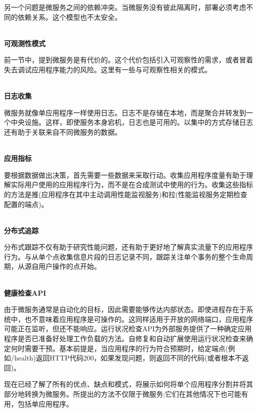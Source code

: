 另一个问题是微服务之间的依赖冲突。当微服务没有彼此隔离时，部署必须考虑不同的依赖关系。这个模型也不太安全。

\hspace*{\fill} \\ %
\noindent
\textbf{可观测性模式}

前一节中，提到微服务是有代价的。这个代价包括引入可观察性的需求，或者冒着失去调试应用程序能力的风险。这里有一些与可观察性相关的模式。

\hspace*{\fill} \\ %
\noindent
\textbf{日志收集}

微服务就像单应用程序一样使用日志。日志不是存储在本地，而是聚合并转发到一个中央设施。这样，即使服务本身宕机，日志也是可用的。以集中的方式存储日志还有助于关联来自不同微服务的数据。

\hspace*{\fill} \\ %
\noindent
\textbf{应用指标}

要根据数据做出决策，首先需要一些数据来采取行动。收集应用程序度量有助于理解实际用户使用的应用程序行为，而不是在合成测试中使用的行为。收集这些指标的方法是推(应用程序在其中主动调用性能监视服务)和拉(性能监视服务定期检查配置的端点)。

\hspace*{\fill} \\ %
\noindent
\textbf{分布式追踪}

分布式跟踪不仅有助于研究性能问题，还有助于更好地了解真实流量下的应用程序行为。与从单个点收集信息片段的日志记录不同，跟踪关注单个事务的整个生命周期，从源自用户操作的点开始。

\hspace*{\fill} \\ %
\noindent
\textbf{健康检查API}

由于微服务通常是自动化的目标，因此需要能够传达内部状态。即使进程存在于系统中，也不意味着应用程序是可操作的。这同样适用于开放的网络端口，应用程序可能正在监听，但还不能响应。运行状况检查API为外部服务提供了一种确定应用程序是否已准备好处理工作负载的方法。自修复和自动扩展使用运行状况检查来确定何时需要干预。基本前提是，当应用程序的行为符合预期时，给定端点(例如/health)返回HTTP代码200，如果发现问题，则返回不同的代码(或者根本不返回)。

现在已经了解了所有的优点、缺点和模式，将展示如何将单个应用程序分割并将其部分地转换为微服务。所提出的方法不仅限于微服务;它们在其他情况下也可能有用，包括单应用程序。















